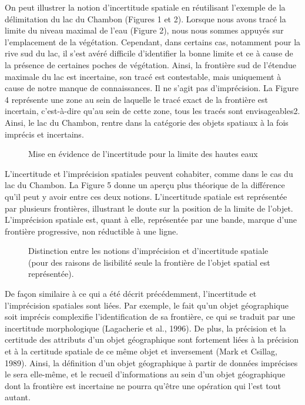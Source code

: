 On peut illustrer la notion d’incertitude spatiale en réutilisant
l’exemple de la délimitation du lac du Chambon (Figures 1 et
2). Lorsque nous avons tracé la limite du niveau maximal de l’eau
(Figure 2), nous nous sommes appuyés sur l’emplacement de la
végétation. Cependant, dans certains cas, notamment pour la rive sud
du lac, il s’est avéré difficile d’identifier la bonne limite et ce à
cause de la présence de certaines poches de végétation. Ainsi, la
frontière sud de l’étendue maximale du lac est incertaine, son tracé
est contestable, mais uniquement à cause de notre manque de
connaissances. Il ne s’agit pas d’imprécision. La Figure 4 représente
une zone au sein de laquelle le tracé exact de la frontière est
incertain, c’est-à-dire qu’au sein de cette zone, tous les tracés sont
envisageables2. Ainsi, le lac du Chambon, rentre dans la catégorie des
objets spatiaux à la fois imprécis et incertains.

\begin{figure}
  \centering
  \caption{Mise en évidence de l'incertitude pour la limite des hautes
  eaux}
  \label{fig:lim_champ_inc}
\end{figure}

L’incertitude et l’imprécision spatiales peuvent cohabiter, comme dans
le cas du lac du Chambon. La Figure 5 donne un aperçu plus théorique
de la différence qu’il peut y avoir entre ces deux
notions. L’incertitude spatiale est représentée par plusieurs
frontières, illustrant le doute sur la position de la limite de
l’objet. L’imprécision spatiale est, quant à elle, représentée par une
bande, marque d’une frontière progressive, non réductible à une ligne.

\begin{figure}
  \centering
  \caption{Distinction entre les notions d’imprécision et
    d'incertitude spatiale (pour des raisons de lisibilité seule la
    frontière de l’objet spatial est représentée).}
  \label{fig:inc_vs_imp}
\end{figure}

De façon similaire à ce qui a été décrit précédemment, l’incertitude
et l’imprécision spatiales sont liées. Par exemple, le fait qu’un
objet géographique soit imprécis complexifie l’identification de sa
frontière, ce qui se traduit par une incertitude morphologique
(Lagacherie et al., 1996). De plus, la précision et la certitude des
attributs d’un objet géographique sont fortement liées à la précision
et à la certitude spatiale de ce même objet et inversement (Mark et
Csillag, 1989). Ainsi, la définition d’un objet géographique à partir
de données imprécises le sera elle-même, et le recueil d’informations
au sein d’un objet géographique dont la frontière est incertaine ne
pourra qu’être une opération qui l’est tout autant.

